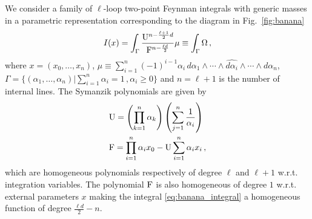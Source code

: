 \documentclass[11pt]{article}
\begin{document}
We consider a family of $\ell$-loop two-point Feynman integrals with generic masses in a parametric representation corresponding to the diagram in Fig.~\ref{fig:banana}
\begin{align}\label{eq:banana_integral}
I(x) = \int_{\Gamma} \frac{{\rm U}^{n-\frac{\ell+1}{2}d}}{{\rm F}^{n - \frac{\ell d}{2}}} \mu\equiv \int_{\Gamma} \Omega \,, 
\end{align}
where $x=(x_{0}, \hdots , x_{n})$, $
\mu \equiv \sum _{i=1}^{n} (-1)^{i-1}\alpha_{i} \, d\alpha_{1} \wedge \cdots \wedge \widehat{d\alpha_{i}} \wedge \cdots \wedge d\alpha_{n}$, $\Gamma= \lbrace (\alpha_{1}, \hdots , \alpha_{n}) \vert
\sum_{i=1}^{n}\alpha_{i} =1 \,, \alpha_{i} \geq 0 \rbrace$ and $n=\ell+1$ is the number of internal lines.
The Symanzik polynomials are given by
\begin{align}
&{\rm U} =  \left( \prod_{k=1}^{n} \alpha_{k} \right) \left( \sum_{j=1}^{n} \frac{1}{\alpha_{i}} \right)\\
&{\rm F} = \prod_{i=1}^{n}\alpha_{i} x_{0} - {\rm U} \sum_{i=1}^{n} \alpha_{i} x_{i} \,,
\end{align}
which are homogeneous polynomials respectively of degree $\ell$ and $\ell + 1$ w.r.t. integration variables. The polynomial ${\rm F}$ is also homogeneous of degree $1$ w.r.t. external parameters $x$ making the integral \eqref{eq:banana_integral} a homogeneous function of degree $\frac{\ell d}{2} -n$.
\end{document}
